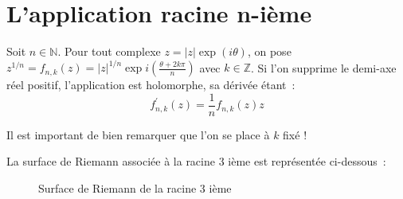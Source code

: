 \section{L'application racine n-ième}
Soit $n \in \mathbb{N}$.
Pour tout complexe $z = |z| \exp(i \theta)$, on pose $z^{1/n} = f_{n,k}(z) = 
|z|^{1/n} \exp i \left ( \frac{\theta+ 2 k \pi}{n}  
\right ) $ avec $k \in \mathbb{Z}$. Si l'on supprime le demi-axe réel
positif, l'application est holomorphe, sa dérivée étant~:
\[
f_{n,k}^\prime(z) = \frac{1}{n}{f_{n,k}(z)}{z}
\]

Il est important de bien remarquer que l'on se place à $k$ fixé !

La surface de Riemann associée à la racine 3 ième est représentée
ci-dessous~:
\begin{figure}[h]
\caption{Surface de Riemann de la racine 3 ième}\label{Fi:fig5}
\end{figure}
